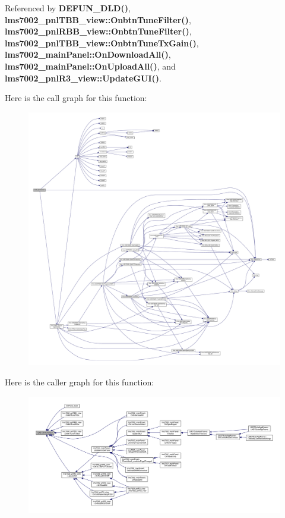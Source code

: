 Referenced by {\bf D\+E\+F\+U\+N\+\_\+\+D\+L\+D()}, {\bf lms7002\+\_\+pnl\+T\+B\+B\+\_\+view\+::\+Onbtn\+Tune\+Filter()}, {\bf lms7002\+\_\+pnl\+R\+B\+B\+\_\+view\+::\+Onbtn\+Tune\+Filter()}, {\bf lms7002\+\_\+pnl\+T\+B\+B\+\_\+view\+::\+Onbtn\+Tune\+Tx\+Gain()}, {\bf lms7002\+\_\+main\+Panel\+::\+On\+Download\+All()}, {\bf lms7002\+\_\+main\+Panel\+::\+On\+Upload\+All()}, and {\bf lms7002\+\_\+pnl\+R3\+\_\+view\+::\+Update\+G\+U\+I()}.



Here is the call graph for this function\+:
\nopagebreak
\begin{figure}[H]
\begin{center}
\leavevmode
\includegraphics[width=350pt]{df/de1/lms7__api_8cpp_a2ccb0cffc848f216211007df824b3c65_cgraph}
\end{center}
\end{figure}




Here is the caller graph for this function\+:
\nopagebreak
\begin{figure}[H]
\begin{center}
\leavevmode
\includegraphics[width=350pt]{df/de1/lms7__api_8cpp_a2ccb0cffc848f216211007df824b3c65_icgraph}
\end{center}
\end{figure}


